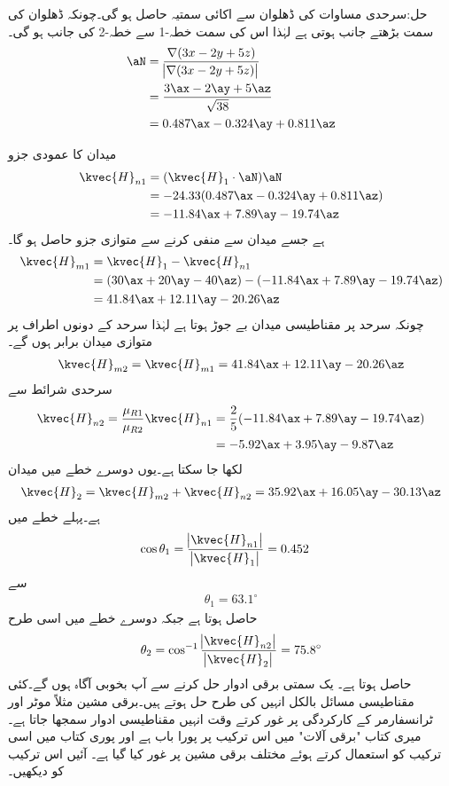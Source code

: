 حل:سرحدی مساوات کی ڈھلوان سے اکائی سمتیہ حاصل ہو گی۔چونکہ ڈھلوان کی سمت بڑھتے جانب ہوتی ہے لہٰذا اس کی سمت خطہ-1 سے خطہ-2 کی جانب ہو گی۔
\begin{align*}
\aN&=\frac{\nabla (3x-2y+5z)}{\abs{\nabla (3x-2y+5z)}}\\
&=\frac{3\ax-2\ay+5\az}{\sqrt{38}}\\
&=0.487\ax-0.324\ay+0.811\az
\end{align*} 

میدان کا عمودی جزو
\begin{align*}
\kvec{H}_{n1}&=(\kvec{H}_1 \cdot \aN) \aN\\
&=-24.33(0.487\ax-0.324\ay+0.811\az)\\
&=-11.84\ax+7.89\ay-19.74\az
\end{align*}
ہے جسے میدان سے منفی کرنے سے متوازی جزو حاصل ہو گا۔
\begin{align*}
\kvec{H}_{m1}&=\kvec{H}_1-\kvec{H}_{n1}\\
&=(30\ax+20\ay-40\az)-(-11.84\ax+7.89\ay-19.74\az)\\
&=41.84\ax+12.11\ay-20.26\az
\end{align*}
چونکہ سرحد پر مقناطیسی میدان بے جوڑ ہوتا ہے لہٰذا سرحد  کے دونوں اطراف پر متوازی میدان برابر ہوں گے۔
\begin{align*}
\kvec{H}_{m2}=\kvec{H}_{m1}=41.84\ax+12.11\ay-20.26\az
\end{align*}
سرحدی شرائط سے 
\begin{align*}
\kvec{H}_{n2}=\frac{\mu_{R1}}{\mu_{R2}} \kvec{H}_{n1}&=\frac{2}{5}(-11.84\ax+7.89\ay-19.74\az)\\
&=-5.92\ax+3.95\ay-9.87\az
\end{align*}
لکھا جا سکتا ہے۔یوں دوسرے خطے میں میدان
\begin{align*}
\kvec{H}_2=\kvec{H}_{m2}+\kvec{H}_{n2}=35.92\ax+16.05\ay-30.13\az
\end{align*}
ہے۔پہلے خطے میں
\begin{align*}
\cos \theta_1&=\frac{\abs{\kvec{H}_{n1}}}{\abs{\kvec{H}_1}}=0.452
\end{align*}
سے
\begin{align*}
\theta_1=63.1^{\circ}
\end{align*}
حاصل ہوتا ہے جبکہ دوسرے خطے میں اسی طرح
\begin{align*}
\theta_2=\cos^{-1} \frac{\abs{\kvec{H}_{n2}}}{\abs{\kvec{H}_2}}=75.8^{\circ}
\end{align*}
حاصل ہوتا ہے۔
یک سمتی برقی ادوار حل کرنے سے آپ بخوبی آگاہ ہوں گے۔کئی مقناطیسی مسائل بالکل انہیں کی طرح حل ہوتے ہیں۔برقی مشین مثلاً موٹر اور ٹرانسفارمر کے کارکردگی پر غور کرتے وقت انہیں مقناطیسی ادوار سمجھا جاتا ہے۔میری کتاب "برقی آلات" میں اس ترکیب پر پورا باب ہے اور پوری کتاب میں اسی ترکیب کو استعمال کرتے ہوئے مختلف برقی مشین پر غور کیا گیا ہے۔ آئیں اس ترکیب کو دیکھیں۔

